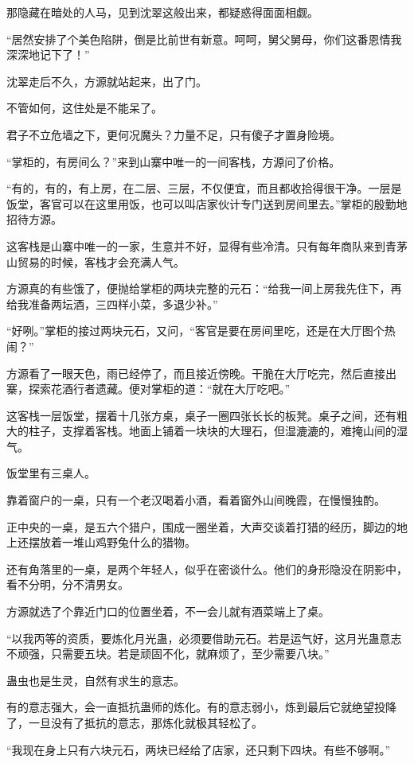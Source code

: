 \begin{this_body}
那隐藏在暗处的人马，见到沈翠这般出来，都疑惑得面面相觑。

“居然安排了个美色陷阱，倒是比前世有新意。呵呵，舅父舅母，你们这番恩情我深深地记下了！”

沈翠走后不久，方源就站起来，出了门。

不管如何，这住处是不能呆了。

君子不立危墙之下，更何况魔头？力量不足，只有傻子才置身险境。

“掌柜的，有房间么？”来到山寨中唯一的一间客栈，方源问了价格。

“有的，有的，有上房，在二层、三层，不仅便宜，而且都收拾得很干净。一层是饭堂，客官可以在这里用饭，也可以叫店家伙计专门送到房间里去。”掌柜的殷勤地招待方源。

这客栈是山寨中唯一的一家，生意并不好，显得有些冷清。只有每年商队来到青茅山贸易的时候，客栈才会充满人气。

方源真的有些饿了，便抛给掌柜的两块完整的元石：“给我一间上房我先住下，再给我准备两坛酒，三四样小菜，多退少补。”

“好咧。”掌柜的接过两块元石，又问，“客官是要在房间里吃，还是在大厅图个热闹？”

方源看了一眼天色，雨已经停了，而且接近傍晚。干脆在大厅吃完，然后直接出寨，探索花酒行者遗藏。便对掌柜的道：“就在大厅吃吧。”

这客栈一层饭堂，摆着十几张方桌，桌子一圈四张长长的板凳。桌子之间，还有粗大的柱子，支撑着客栈。地面上铺着一块块的大理石，但湿漉漉的，难掩山间的湿气。

饭堂里有三桌人。

靠着窗户的一桌，只有一个老汉喝着小酒，看着窗外山间晚霞，在慢慢独酌。

正中央的一桌，是五六个猎户，围成一圈坐着，大声交谈着打猎的经历，脚边的地上还摆放着一堆山鸡野兔什么的猎物。

还有角落里的一桌，是两个年轻人，似乎在密谈什么。他们的身形隐没在阴影中，看不分明，分不清男女。

方源就选了个靠近门口的位置坐着，不一会儿就有酒菜端上了桌。

“以我丙等的资质，要炼化月光蛊，必须要借助元石。若是运气好，这月光蛊意志不顽强，只需要五块。若是顽固不化，就麻烦了，至少需要八块。”

蛊虫也是生灵，自然有求生的意志。

有的意志强大，会一直抵抗蛊师的炼化。有的意志弱小，炼到最后它就绝望投降了，一旦没有了抵抗的意志，那炼化就极其轻松了。

“我现在身上只有六块元石，两块已经给了店家，还只剩下四块。有些不够啊。”


\end{this_body}
